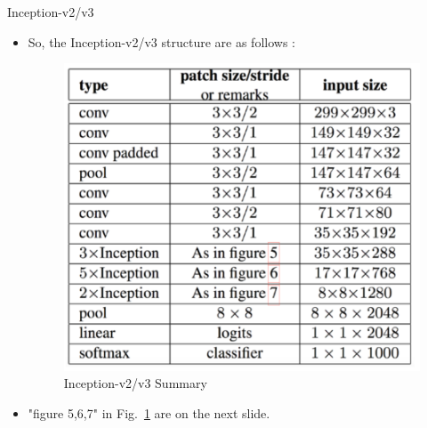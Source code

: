 \documentclass{beamer}
\begin{document}
\begin{frame}{Inception-v2/v3}
	\begin{itemize}
		\item So, the Inception-v2/v3 structure are as follows :
		\vspace{10pt}
	\begin{figure}[h]		
		\centering
		\includegraphics[scale=0.63]{./v2_v3/v2_summary.PNG}
		\caption{Inception-v2/v3 Summary}
		\label{inceptionv2summary}
	\end{figure}
		\item "figure 5,6,7" in Fig.~\ref{inceptionv2summary} are on the next slide.
	\end{itemize}
\end{frame}
\end{document}

